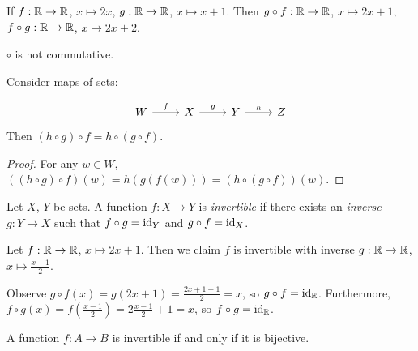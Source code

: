 \documentclass{../template/note}
\begin{document}
    \begin{example}
        If \(f: \mathbb R \to \mathbb R\), \(x \mapsto 2x\), \(g: \mathbb R \to \mathbb R\), \(x \mapsto x+1\). Then \(g \circ f: \mathbb R \to \mathbb R\), \(x \mapsto 2x + 1\), \(f \circ g: \mathbb R \to \mathbb R\), \(x \mapsto 2x + 2\).
    \end{example}
    
    \begin{remark*}
        \(\circ\) is not commutative.
    \end{remark*}
    
    \begin{lemma}
        Consider maps of sets:

        \[\begin{tikzcd}
            W & X & Y & Z
            \arrow["f", from=1-1, to=1-2]
            \arrow["g", from=1-2, to=1-3]
            \arrow["h", from=1-3, to=1-4]
        \end{tikzcd}\]
        Then \((h \circ g) \circ f = h \circ (g \circ f)\).
        \label{associativity-of-function-composition}
    \end{lemma}
    
    \begin{proof}
        For any \(w \in W\), \(((h \circ g) \circ f)(w) = h(g(f(w))) = (h \circ (g \circ f))(w)\).
    \end{proof}

    \begin{definition}
        Let \(X\), \(Y\) be sets. A function \(f: X \to Y\) is \emph{invertible} if there exists an \emph{inverse} \(g: Y \to X\) such that \(f \circ g = \operatorname{id}_Y\) and \(g \circ f = \operatorname{id}_X\).
    \end{definition}
    
    \begin{example}
        Let \(f: \mathbb R \to \mathbb R\), \(x \mapsto 2x+1\). Then we claim \(f\) is invertible with inverse \(g: \mathbb R \to \mathbb R\), \(x \mapsto \frac{x-1}{2}\).

        Observe \(g \circ f(x) = g(2x+1) = \frac{2x+1-1}{2} = x\), so \(g \circ f = \operatorname{id}_\mathbb R\). Furthermore, \(f \circ g(x) = f(\frac{x-1}{2}) = 2\frac{x-1}{2} + 1 = x\), so \(f \circ g = \operatorname{id}_\mathbb R\).
    \end{example}
    
    \begin{theorem}
        A function \(f: A \to B\) is invertible if and only if it is bijective.
    \end{theorem}
    
\end{document}
